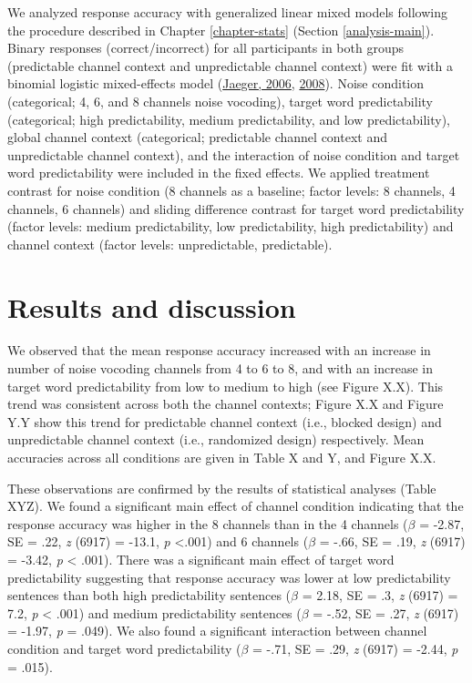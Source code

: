 \documentclass[a4paper, nobind]{templates/ociamthesis}
\begin{document}
We analyzed response accuracy with generalized linear mixed models following the procedure described in Chapter \ref{chapter-stats} (Section \ref{analysis-main}).
Binary responses (correct/incorrect) for all participants in both groups (predictable channel context and unpredictable channel context) were fit with a binomial logistic mixed-effects model (\protect\hyperlink{ref-Jaeger2006}{Jaeger, 2006}, \protect\hyperlink{ref-Jaeger2008}{2008}).
Noise condition (categorical; 4, 6, and 8 channels noise vocoding), target word predictability (categorical; high predictability, medium predictability, and low predictability), global channel context (categorical; predictable channel context and unpredictable channel context), and the interaction of noise condition and target word predictability were included in the fixed effects.
We applied treatment contrast for noise condition (8 channels as a baseline; factor levels: 8 channels, 4 channels, 6 channels) and sliding difference contrast for target word predictability (factor levels: medium predictability, low predictability, high predictability) and channel context (factor levels: unpredictable, predictable).

\hypertarget{results-and-discussion-2}{%
\section{Results and discussion}\label{results-and-discussion-2}}

We observed that the mean response accuracy increased with an increase in number of noise vocoding channels from 4 to 6 to 8, and with an increase in target word predictability from low to medium to high (see Figure X.X).
This trend was consistent across both the channel contexts;
Figure X.X and Figure Y.Y show this trend for predictable channel context (i.e., blocked design) and unpredictable channel context (i.e., randomized design) respectively.
Mean accuracies across all conditions are given in Table X and Y, and Figure X.X.

These observations are confirmed by the results of statistical analyses (Table XYZ).
We found a significant main effect of channel condition indicating that the response accuracy was higher in the 8 channels
than in the 4 channels (\(\beta\) = -2.87, SE = .22, \emph{z} (6917) = -13.1, \emph{p} \textless.001) and
6 channels (\(\beta\) = -.66, SE = .19, \emph{z} (6917) = -3.42, \emph{p} \textless{} .001).
There was a significant main effect of target word predictability suggesting that response accuracy was lower at low predictability sentences
than both high predictability sentences (\(\beta\) = 2.18, SE = .3, \emph{z} (6917) = 7.2, \emph{p} \textless{} .001) and
medium predictability sentences (\(\beta\) = -.52, SE = .27, \emph{z} (6917) = -1.97, \emph{p} = .049).
We also found a significant interaction between channel condition and target word predictability (\(\beta\) = -.71, SE = .29, \emph{z} (6917) = -2.44, \emph{p} = .015).
\end{document}
